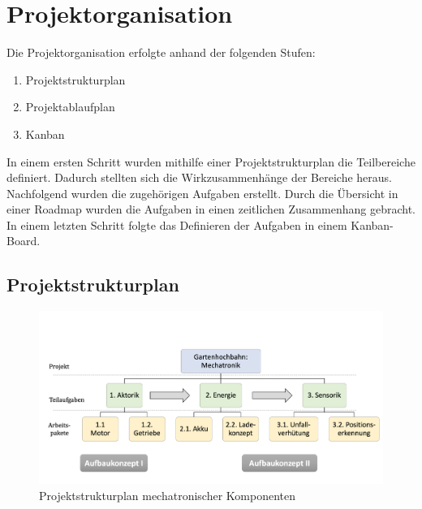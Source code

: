 \section{Projektorganisation}
\label{projektorganisation}
Die Projektorganisation erfolgte anhand der folgenden Stufen: 

\begin{enumerate}
	\item Projektstrukturplan %
	\item Projektablaufplan 
	\item Kanban
	
\end{enumerate}

In einem ersten Schritt wurden mithilfe einer Projektstrukturplan die Teilbereiche definiert. Dadurch stellten sich die Wirkzusammenhänge der Bereiche heraus. Nachfolgend wurden die zugehörigen Aufgaben erstellt. Durch die Übersicht in einer Roadmap wurden die Aufgaben in einen zeitlichen Zusammenhang gebracht. 
In einem letzten Schritt folgte das Definieren der Aufgaben in einem Kanban-Board. 

	
\newpage
\subsection{Projektstrukturplan}
\label{projektstrukturplan}
\begin{figure}[h]
	\begin{center}
		\includegraphics[width=17cm]{structureMech.png}
		\caption{Projektstrukturplan mechatronischer Komponenten}
		\label{pic:structure_mech}
	\end{center}
\end{figure}

